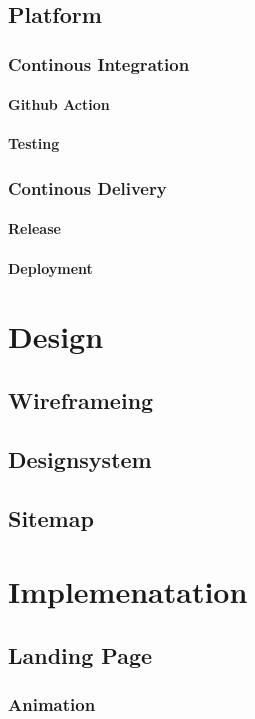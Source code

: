 \subsection{ Platform }
\subsubsection{ Continous Integration }
\paragraph{ Github Action }
\paragraph{ Testing }
\subsubsection{ Continous Delivery }
\paragraph{ Release }
\paragraph{ Deployment }

\section{ Design } 
\subsection{ Wireframeing}
\subsection{ Designsystem }
\subsection{ Sitemap }

\section{ Implemenatation} 
\subsection{ Landing Page } 
\subsubsection{ Animation }
